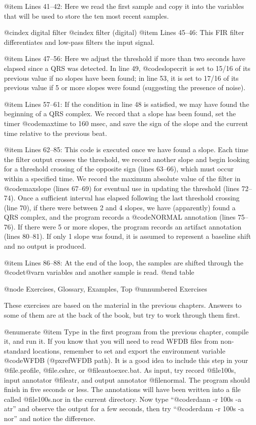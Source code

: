 {{{{{{{{{@item Lines 41--42:
Here we read the first sample and copy it into the variables that will
be used to store the ten most recent samples.

@cindex digital filter
@cindex filter (digital)
@item Lines 45--46:
This FIR filter differentiates and low-pass filters the input signal.

@item Lines 47--56:
Here we adjust the threshold if more than two seconds have elapsed since
a QRS was detected.  In line 49, @code{slopecrit} is set to 15/16 of its
previous value if no slopes have been found;  in line 53, it is set to
17/16 of its previous value if 5 or more slopes were found (suggesting
the presence of noise).

@item Lines 57--61:
If the condition in line 48 is satisfied, we may have found the beginning
of a QRS complex.  We record that a slope has been found, set the timer
@code{maxtime} to 160 msec, and save the sign of the slope and the current
time relative to the previous beat.

@item Lines 62--85:
This code is executed once we have found a slope.  Each time the filter
output crosses the threshold, we record another slope and begin looking
for a threshold crossing of the opposite sign (lines 63--66), which must
occur within a specified time.  We record the maximum absolute value of
the filter in @code{maxslope} (lines 67--69) for eventual use in updating
the threshold (lines 72--74).  Once a sufficient interval has elapsed
following the last threshold crossing (line 70), if there were between
2 and 4 slopes, we have (apparently) found a QRS complex, and the program
records a @code{NORMAL} annotation (lines 75--76).  If there were 5 or more
slopes, the program records an artifact annotation (lines 80--81).  If
only 1 slope was found, it is assumed to represent a baseline shift and
no output is produced.

@item Lines 86--88:
At the end of the loop, the samples are shifted through the @code{t@var{n}}
variables and another sample is read.
@end table

@node     Exercises, Glossary, Examples, Top
@unnumbered Exercises

These exercises are based on the material in the previous chapters.
Answers to some of them are at the back of the book, but try to work
through them first.

@enumerate
@item
Type in the first program from the previous chapter, compile it, and run
it.  If you know that you will need to read WFDB files from non-standard
locations, remember to set and export the environment variable @code{WFDB}
(@pxref{WFDB path}).  It is a good idea to include this step in your
@file{.profile}, @file{.cshrc}, or @file{autoexec.bat}.  As input, try
record @file{100s}, input annotator @file{atr}, and output annotator
@file{normal}.  The program should finish in five seconds or less.
The annotations will have been written into a file called
@file{100s.nor} in the current directory.  Now type
``@code{rdann -r 100s -a atr}'' and observe the output
for a few seconds, then try ``@code{rdann -r 100s -a nor}'' and notice the
difference.

}}}}}}}}}
